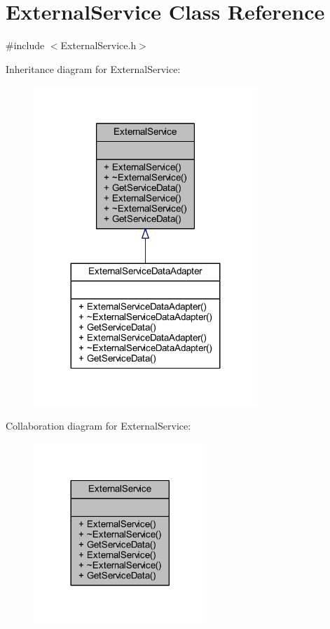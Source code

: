 \hypertarget{class_external_service}{}\section{External\+Service Class Reference}
\label{class_external_service}


{\ttfamily \#include $<$External\+Service.\+h$>$}



Inheritance diagram for External\+Service\+:
\nopagebreak
\begin{figure}[H]
\begin{center}
\leavevmode
\includegraphics[width=239pt]{class_external_service__inherit__graph}
\end{center}
\end{figure}


Collaboration diagram for External\+Service\+:
\nopagebreak
\begin{figure}[H]
\begin{center}
\leavevmode
\includegraphics[width=185pt]{class_external_service__coll__graph}
\end{center}
\end{figure}
